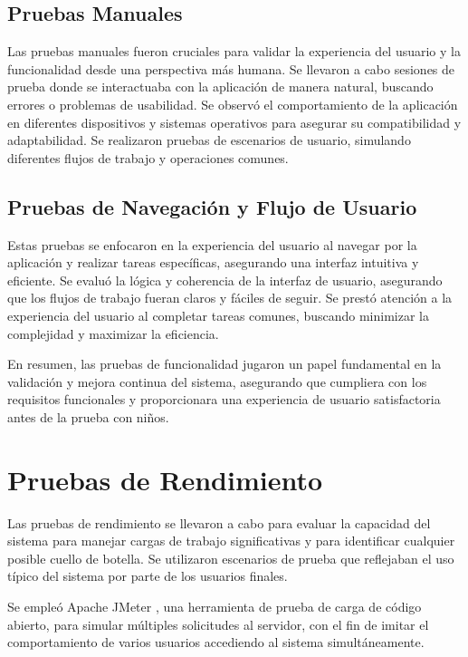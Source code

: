 \subsection{Pruebas Manuales}
Las pruebas manuales fueron cruciales para validar la experiencia del usuario y la funcionalidad desde una perspectiva más humana. Se llevaron a cabo sesiones de prueba donde se interactuaba con la aplicación de manera natural, buscando errores o problemas de usabilidad. Se observó el comportamiento de la aplicación en diferentes dispositivos y sistemas operativos para asegurar su compatibilidad y adaptabilidad. Se realizaron pruebas de escenarios de usuario, simulando diferentes flujos de trabajo y operaciones comunes.

\subsection{Pruebas de Navegación y Flujo de Usuario}

Estas pruebas se enfocaron en la experiencia del usuario al navegar por la aplicación y realizar tareas específicas, asegurando una interfaz intuitiva y eficiente. Se evaluó la lógica y coherencia de la interfaz de usuario, asegurando que los flujos de trabajo fueran claros y fáciles de seguir. Se prestó atención a la experiencia del usuario al completar tareas comunes, buscando minimizar la complejidad y maximizar la eficiencia.

En resumen, las pruebas de funcionalidad jugaron un papel fundamental en la validación y mejora continua del sistema, asegurando que cumpliera con los requisitos funcionales y proporcionara una experiencia de usuario satisfactoria antes de la prueba con niños.


\section{Pruebas de Rendimiento}

Las pruebas de rendimiento se llevaron a cabo para evaluar la capacidad del sistema para manejar cargas de trabajo significativas y para identificar cualquier posible cuello de botella. Se utilizaron escenarios de prueba que reflejaban el uso típico del sistema por parte de los usuarios finales.

Se empleó Apache JMeter \cite{jmeter}, una herramienta de prueba de carga de código abierto, para simular múltiples solicitudes al servidor, con el fin de imitar el comportamiento de varios usuarios accediendo al sistema simultáneamente. 

